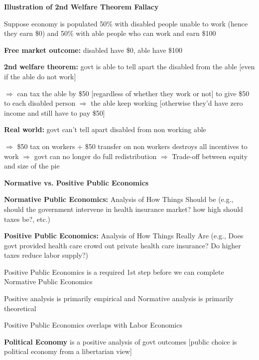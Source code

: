 \documentclass[landscape]{slides}
\begin{document}
\begin{slide}
\begin{center}
{\bf Illustration of 2nd Welfare Theorem Fallacy}
\end{center}
Suppose economy is populated 50\% with disabled people unable to work (hence they earn \$0) and 50\% with able people
who can work and earn \$100

\textbf{Free market outcome:} disabled have \$0, able have \$100

\textbf{2nd welfare theorem:} govt is able to tell apart the disabled from the able [even if the able do not work] 

\small
$\Rightarrow$
can tax the able by \$50 [regardless of whether they work or not] to give \$50 to each disabled person $\Rightarrow$ the able keep working [otherwise they'd have zero income and still have to pay \$50]

\normalsize 
 
\textbf{Real world:} govt can't tell apart disabled from non working able

\small
$\Rightarrow$ \$50 tax on workers + \$50 transfer on non workers destroys all incentives to work $\Rightarrow$ govt can no longer do full redistribution $\Rightarrow$ Trade-off between equity and size of the pie

\small



\end{slide}


\begin{slide}
\begin{center}
{\bf Normative vs. Positive Public Economics}
\end{center}

{\bf Normative Public Economics:} Analysis of How Things Should be
(e.g., should the government intervene in health insurance market?
how high should taxes be?, etc.)



{\bf Positive Public Economics:} Analysis of How Things Really Are
(e.g., Does govt provided health care crowd out private health
care insurance? Do higher taxes reduce labor supply?)

Positive Public Economics is a required 1st step before we can
complete Normative Public Economics

Positive analysis is primarily empirical and Normative analysis is
primarily theoretical

Positive Public Economics overlaps with Labor Economics

{\bf Political Economy} is a positive analysis of govt outcomes
[public choice is political economy from a libertarian view]


\end{slide}
\end{document}
